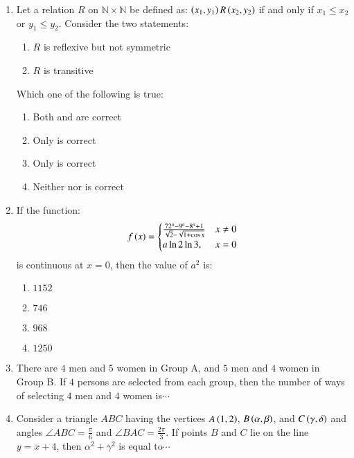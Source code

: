 \documentclass[journal,12pt,twocolumn]{IEEEtran}
\theoremstyle{remark}
\begin{document}
\begin{enumerate}[start=16]
    \item Let a relation $R$ on $\mathbb{N} \times \mathbb{N}$ be defined as: $\left(x_1, y_1\right) R \left(x_2, y_2\right)$ if and only if $x_1 \leq x_2$ or $y_1 \leq y_2$. Consider the two statements:
   \hfill{}
	    \begin{enumerate}
        \item $R$ is reflexive but not symmetric
        \item $R$ is transitive
    \end{enumerate}
    Which one of the following is true:
   \hfill{}
		\begin{enumerate}
        \item Both  and  are correct
        \item Only  is correct
        \item Only  is correct
        \item Neither  nor  is correct
    \end{enumerate}

    \item If the function:
    $$
		f\left(x\right) = 
    \begin{cases}
    \frac{72^a-9^a-8^a+1}{\sqrt{2}-\sqrt{1+\cos x}} &  x \neq 0 \\
    a\ln{2}\ln{3}, &  x = 0
    \end{cases}
    $$
    is continuous at $x = 0$, then the value of $a^2$ is:
   \hfill{}
		\begin{enumerate}
        \item $1152$
        \item $746$
        \item $968$
        \item $1250$
    \end{enumerate}

    \item There are $4$ men and $5$ women in Group A, and $5$ men and $4$ women in Group B. If $4$ persons are selected from each group, then the number of ways of selecting $4$ men and $4$ women is$\cdots$
    \hfill{}

    \item Consider a triangle $ABC$ having the vertices $A\left(1, 2\right)$, $B\left(\alpha, \beta\right)$, and $C\left(\gamma, \delta\right)$ and angles $\angle ABC = \frac{\pi}{6}$ and $\angle BAC = \frac{2\pi}{3}$. If points $B$ and $C$ lie on the line $y = x + 4$, then $\alpha^2 + \gamma^2$ is equal to$\cdots$
    \hfill{}


\end{enumerate}
\end{document}

